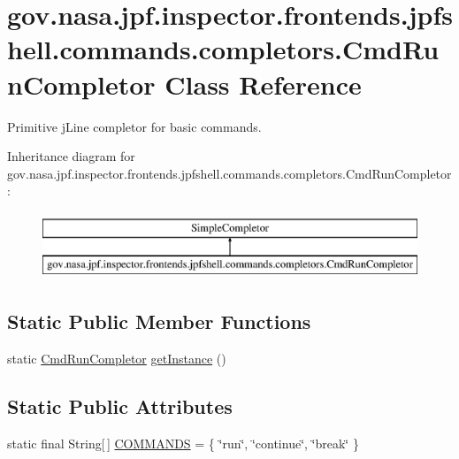 \hypertarget{classgov_1_1nasa_1_1jpf_1_1inspector_1_1frontends_1_1jpfshell_1_1commands_1_1completors_1_1_cmd_run_completor}{}\section{gov.\+nasa.\+jpf.\+inspector.\+frontends.\+jpfshell.\+commands.\+completors.\+Cmd\+Run\+Completor Class Reference}
\label{classgov_1_1nasa_1_1jpf_1_1inspector_1_1frontends_1_1jpfshell_1_1commands_1_1completors_1_1_cmd_run_completor}


Primitive j\+Line completor for basic commands.  


Inheritance diagram for gov.\+nasa.\+jpf.\+inspector.\+frontends.\+jpfshell.\+commands.\+completors.\+Cmd\+Run\+Completor\+:\begin{figure}[H]
\begin{center}
\leavevmode
\includegraphics[height=2.000000cm]{classgov_1_1nasa_1_1jpf_1_1inspector_1_1frontends_1_1jpfshell_1_1commands_1_1completors_1_1_cmd_run_completor}
\end{center}
\end{figure}
\subsection*{Static Public Member Functions}
\begin{DoxyCompactItemize}
\item 
static \hyperlink{classgov_1_1nasa_1_1jpf_1_1inspector_1_1frontends_1_1jpfshell_1_1commands_1_1completors_1_1_cmd_run_completor}{Cmd\+Run\+Completor} \hyperlink{classgov_1_1nasa_1_1jpf_1_1inspector_1_1frontends_1_1jpfshell_1_1commands_1_1completors_1_1_cmd_run_completor_ad997ee389301df09ef8942ce11c958d4}{get\+Instance} ()
\end{DoxyCompactItemize}
\subsection*{Static Public Attributes}
\begin{DoxyCompactItemize}
\item 
static final String\mbox{[}$\,$\mbox{]} \hyperlink{classgov_1_1nasa_1_1jpf_1_1inspector_1_1frontends_1_1jpfshell_1_1commands_1_1completors_1_1_cmd_run_completor_ad33ac35ef60807841cb7de63cd946e9d}{C\+O\+M\+M\+A\+N\+DS} = \{ \char`\"{}run\char`\"{}, \char`\"{}continue\char`\"{}, \char`\"{}break\char`\"{} \}
\end{DoxyCompactItemize}
